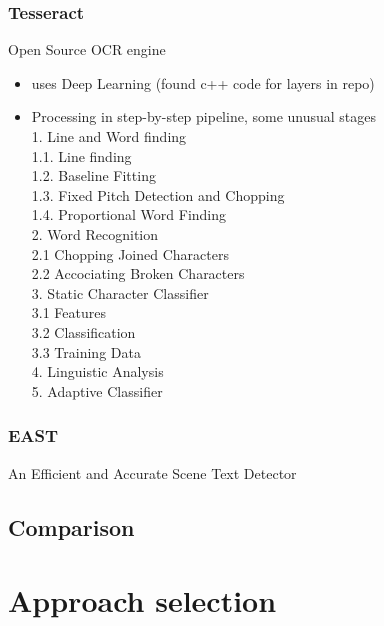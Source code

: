 \subsubsection*{Tesseract}
Open Source OCR engine~\cite{smith_overview_2007}
\begin{itemize}
    \item uses Deep Learning (found c++ code for layers in repo)
    \item Processing in step-by-step pipeline, some unusual stages\\
        1. Line and Word finding\\
        1.1. Line finding\\
        1.2. Baseline Fitting\\
        1.3. Fixed Pitch Detection and Chopping\\
        1.4. Proportional Word Finding\\
        2. Word Recognition\\
        2.1 Chopping Joined Characters\\
        2.2 Accociating Broken Characters\\
        3. Static Character Classifier\\
        3.1 Features\\
        3.2 Classification\\
        3.3 Training Data\\
        4. Linguistic Analysis\\
        5. Adaptive Classifier
\end{itemize}

\subsubsection*{EAST}
An Efficient and Accurate Scene Text Detector



\subsection{Comparison}

\section{Approach selection}
